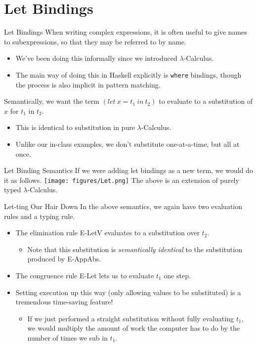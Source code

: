 \documentclass[11pt]{beamer}
\begin{document}
\section[Let]{Let Bindings}
\begin{frame}[fragile=singleslide]{Let Bindings}
When writing complex expressions, it is often useful to give names to subexpressions, so that they may be referred to by name.  
\begin{itemize}
\item We've been doing this informally since we introduced $\lambda$-Calculus. 
\item The main way of doing this in Haskell explicitly is  \texttt{where} bindings, though the process is also implicit in pattern matching. 
\end{itemize}
Semantically, we want the term $(let\:x = t_1\:in\:t_2)$ to evaluate to a substitution of $x$ for $t_1$ in $t_2$.
\begin{itemize}
\item This is identical to substitution in pure $\lambda$-Calculus.
\item Unlike our in-class examples, we don't substitute one-at-a-time, but all at once.  
\end{itemize}
\end{frame}


\begin{frame}[fragile=singleslide]{Let Binding Semantics}
If we were adding let bindings as a new term, we would do it as follows.  
\texttt{[image: figures/Let.png]}
The above is an extension of purely typed $\lambda$-Calculus.
\end{frame}


\begin{frame}[fragile=singleslide]{Let-ting Our Hair Down}
In the above semantics, we again have two evaluation rules and a typing rule.
\begin{itemize}
\item The elimination rule E-LetV evaluates to a substitution over $t_2$.
\begin{itemize}
\item Note that this substitution is \emph{semantically identical} to the substitution produced by E-AppAbs.
\end{itemize}
\item The congruence rule E-Let lets us to evaluate $t_1$ one step.
\item Setting execution up this way (only allowing values to be substituted) is a tremendous time-saving feature! 
\begin{itemize}
\item If we just performed a straight substitution without fully evaluating $t_1$, we would multiply the amount of work the computer has to do by the number of times we sub in $t_1$.  
\end{itemize}
\end{itemize}
\end{frame}
\end{document}

